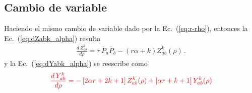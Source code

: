 \documentclass[11pt]{article}
\begin{document}
\subsection{Cambio de variable}

Haciendo el mismo cambio de variable dado por la 
Ec.~(\ref{eq:r-rho}), entonces la Ec.~(\ref{eq:dZabk_alpha})
resulta
\begin{align}
 \frac{d\,Z_{ab}^k}{d\rho}=r\,\overline{P}_a\overline{P}_b - \left(r\alpha+k\right) Z_{ab}^k(\rho)\,.
 \label{eq:dZabk_rho_alpha}
\end{align}
y la Ec.~(\ref{eq:dYabk_alpha}) se reescribe como
\begin{align}
 \color{red} 
 \frac{d\,Y_{ab}^k}{d\rho}=-\left[2\alpha r+2k+1\right]Z_{ab}^k(\rho)+\left[\alpha r+k+1\right]Y_{ab}^k(\rho)
 \label{eq:dYabk_rho_alpha}
\end{align}
\end{document}
